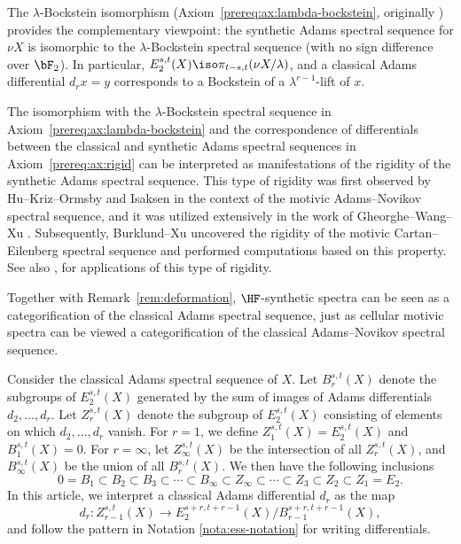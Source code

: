 The $\lambda$-Bockstein isomorphism (Axiom~\ref{prereq:ax:lambda-bockstein}, originally \cite[Theorem A.1]{BHS}) provides the complementary viewpoint: the synthetic Adams spectral sequence for $\nu X$ is isomorphic to the $\lambda$-Bockstein spectral sequence (with no sign difference over $\bF_2$). In particular, $E_2^{s,t}(X)\iso \pi_{t-s,t}(\nu X /\lambda)$, and a classical Adams differential $d_rx=y$ corresponds to a Bockstein of a $\lambda^{r-1}$-lift of $x$.

\begin{remark}
    The isomorphism with the $\lambda$-Bockstein spectral sequence in Axiom~\ref{prereq:ax:lambda-bockstein} and the correspondence of differentials between the classical and synthetic Adams spectral sequences in Axiom~\ref{prereq:ax:rigid} can be interpreted as manifestations of the rigidity of the synthetic Adams spectral sequence. This type of rigidity was first observed by Hu--Kriz--Ormsby \cite{HuKrizOrmsby} and Isaksen \cite{Isaksen} in the context of the motivic Adams--Novikov spectral sequence, and it was utilized extensively in the work of Gheorghe--Wang--Xu \cite{GWX}. Subsequently, Burklund--Xu \cite{BurklundXu} uncovered the rigidity of the motivic Cartan--Eilenberg spectral sequence and performed computations based on this property. See also \cite{mmf}, \cite{Burklund} for applications of this type of rigidity.

    Together with Remark~\ref{rem:deformation}, $\HF$-synthetic spectra can be seen as a categorification of the classical Adams spectral sequence, just as cellular motivic spectra can be viewed a categorification of the classical Adams--Novikov spectral sequence.
\end{remark}

\begin{notation}
    Consider the classical Adams spectral sequence of $X$. Let $B_r^{s,t}(X)$ denote the subgroups of $E_2^{s,t}(X)$ generated by the sum of images of Adams differentials $d_2,\dots,d_r$. Let $Z_r^{s,t}(X)$ denote the subgroup of $E_2^{s,t}(X)$ consisting of elements on which $d_2,\dots,d_r$ vanish. For $r=1$, we define $Z_1^{s,t}(X)=E_2^{s,t}(X)$ and $B_1^{s,t}(X)=0$. For $r=\infty$, let $Z_\infty^{s,t}(X)$ be the intersection of all $Z_r^{s,t}(X)$, and $B_\infty^{s,t}(X)$ be the union of all $B_r^{s,t}(X)$. We then have the following inclusions
    $$0 = B_1 \subset B_2\subset B_3\subset \cdots\subset B_\infty\subset Z_\infty \subset \cdots\subset Z_3\subset Z_2\subset Z_1 = E_2.$$
    In this article, we interpret a classical Adams differential $d_r$ as the map
    $$d_r: Z_{r-1}^{s,t}(X)\to E_2^{s+r,t+r-1}(X)/B_{r-1}^{s+r,t+r-1}(X),$$
    and follow the pattern in Notation \ref{nota:ess-notation} for writing differentials.
\end{notation}


